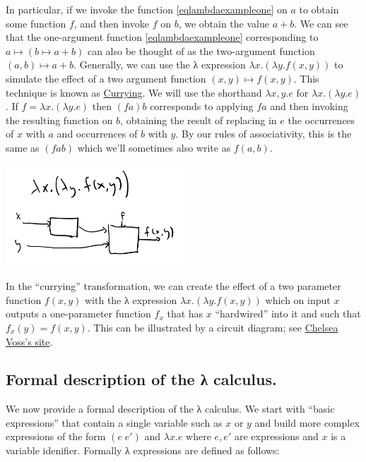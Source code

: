 In particular, if we invoke the function \eqref{eqlambdaexampleone} on
\(a\) to obtain some function \(f\), and then invoke \(f\) on \(b\), we
obtain the value \(a+b\). We can see that the one-argument function
\eqref{eqlambdaexampleone} corresponding to
\(a \mapsto (b \mapsto a+b)\) can also be thought of as the two-argument
function \((a,b) \mapsto a+b\). Generally, we can use the λ expression
\(\lambda x.(\lambda y.f(x,y))\) to simulate the effect of a two
argument function \((x,y) \mapsto f(x,y)\). This technique is known as
\href{https://en.wikipedia.org/wiki/Currying}{Currying}. We will use the
shorthand \(\lambda x,y. e\) for \(\lambda x. (\lambda y. e)\). If
\(f= \lambda x.(\lambda y.e)\) then \((f a) b\) corresponds to applying
\(f a\) and then invoking the resulting function on \(b\), obtaining the
result of replacing in \(e\) the occurrences of \(x\) with \(a\) and
occurrences of \(b\) with \(y\). By our rules of associativity, this is
the same as \((f a b)\) which we'll sometimes also write as \(f(a,b)\).


\begin{marginfigure}
\centering
\includegraphics[width=\linewidth, height=1.5in, keepaspectratio]{../figure/currying.png}
\caption{In the ``currying'' transformation, we can create the effect of
a two parameter function \(f(x,y)\) with the λ expression
\(\lambda x.(\lambda y. f(x,y))\) which on input \(x\) outputs a
one-parameter function \(f_x\) that has \(x\) ``hardwired'' into it and
such that \(f_x(y)=f(x,y)\). This can be illustrated by a circuit
diagram; see \href{https://tromp.github.io/cl/diagrams.html}{Chelsea
Voss's site}.}
\label{currying}
\end{marginfigure}

\subsection{Formal description of the λ
calculus.}\label{Formal-description-of-the}

We now provide a formal description of the λ calculus. We start with
``basic expressions'' that contain a single variable such as \(x\) or
\(y\) and build more complex expressions of the form \((e \; e')\) and
\(\lambda x.e\) where \(e,e'\) are expressions and \(x\) is a variable
idenifier. Formally λ expressions are defined as follows:

